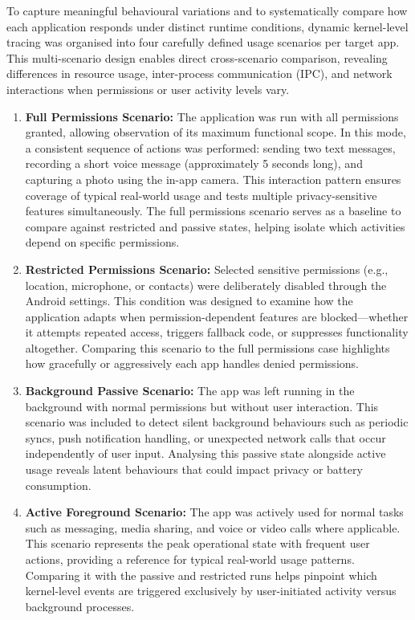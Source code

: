 \documentclass[a4paper,12pt]{report}
\begin{document}
To capture meaningful behavioural variations and to systematically compare how each application responds under distinct runtime conditions, dynamic kernel-level tracing was organised into four carefully defined usage scenarios per target app. This multi-scenario design enables direct cross-scenario comparison, revealing differences in resource usage, inter-process communication (IPC), and network interactions when permissions or user activity levels vary.

\begin{enumerate}[label=\roman*.]
  \item \textbf{Full Permissions Scenario:} The application was run with all permissions granted, allowing observation of its maximum functional scope. In this mode, a consistent sequence of actions was performed: sending two text messages, recording a short voice message (approximately 5 seconds long), and capturing a photo using the in-app camera. This interaction pattern ensures coverage of typical real-world usage and tests multiple privacy-sensitive features simultaneously. The full permissions scenario serves as a baseline to compare against restricted and passive states, helping isolate which activities depend on specific permissions.

  \item \textbf{Restricted Permissions Scenario:} Selected sensitive permissions (e.g., location, microphone, or contacts) were deliberately disabled through the Android settings. This condition was designed to examine how the application adapts when permission-dependent features are blocked—whether it attempts repeated access, triggers fallback code, or suppresses functionality altogether. Comparing this scenario to the full permissions case highlights how gracefully or aggressively each app handles denied permissions.

  \item \textbf{Background Passive Scenario:} The app was left running in the background with normal permissions but without user interaction. This scenario was included to detect silent background behaviours such as periodic syncs, push notification handling, or unexpected network calls that occur independently of user input. Analysing this passive state alongside active usage reveals latent behaviours that could impact privacy or battery consumption.

  \item \textbf{Active Foreground Scenario:} The app was actively used for normal tasks such as messaging, media sharing, and voice or video calls where applicable. This scenario represents the peak operational state with frequent user actions, providing a reference for typical real-world usage patterns. Comparing it with the passive and restricted runs helps pinpoint which kernel-level events are triggered exclusively by user-initiated activity versus background processes.
\end{enumerate}
\end{document}
